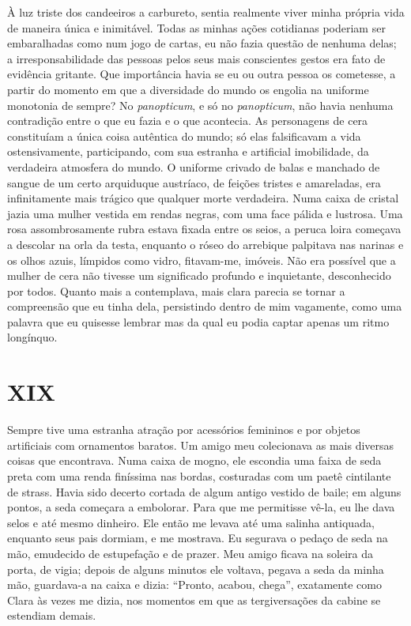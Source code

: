 À luz triste dos candeeiros a carbureto, sentia realmente viver minha própria vida de maneira única e inimitável. Todas as minhas ações cotidianas poderiam ser embaralhadas como num jogo de cartas, eu não fazia questão de nenhuma delas; a irresponsabilidade das pessoas pelos seus mais conscientes gestos era fato de evidência gritante. Que importância havia se eu ou outra pessoa os cometesse, a partir do momento em que a diversidade do mundo os engolia na uniforme monotonia de sempre? No \textit{panopticum}, e só no \textit{panopticum}, não havia nenhuma contradição entre o que eu fazia e o que acontecia. As personagens de cera constituíam a única coisa autêntica do mundo; só elas falsificavam a vida ostensivamente, participando, com sua estranha e artificial imobilidade, da verdadeira atmosfera do mundo. O uniforme crivado de balas e manchado de sangue de um certo arquiduque austríaco, de feições tristes e amareladas, era infinitamente mais trágico que qualquer morte verdadeira. Numa caixa de cristal jazia uma mulher vestida em rendas negras, com uma face pálida e lustrosa. Uma rosa assombrosamente rubra estava fixada entre os seios, a peruca loira começava a descolar na orla da testa, enquanto o róseo do arrebique palpitava nas narinas e os olhos azuis, límpidos como vidro, fitavam-me, imóveis. Não era possível que a mulher de cera não tivesse um significado profundo e inquietante, desconhecido por todos. Quanto mais a contemplava, mais clara parecia se tornar a compreensão que eu tinha dela, persistindo dentro de mim vagamente, como uma palavra que eu quisesse lembrar mas da qual eu podia captar apenas um ritmo longínquo.


\chapter*{\centering\Large{XIX}}

Sempre tive uma estranha atração por acessórios femininos e por objetos artificiais com ornamentos baratos. Um amigo meu colecionava as mais diversas coisas que encontrava. Numa caixa de mogno, ele escondia uma faixa de seda preta com uma renda finíssima nas bordas, costuradas com um paetê cintilante de strass. Havia sido decerto cortada de algum antigo vestido de baile; em alguns pontos, a seda começara a embolorar. Para que me permitisse vê-la, eu lhe dava selos e até mesmo dinheiro. Ele então me levava até uma salinha antiquada, enquanto seus pais dormiam, e me mostrava. Eu segurava o pedaço de seda na mão, emudecido de estupefação e de prazer. Meu amigo ficava na soleira da porta, de vigia; depois de alguns minutos ele voltava, pegava a seda da minha mão, guardava-a na caixa e dizia: ``Pronto, acabou, chega'', exatamente como Clara às vezes me dizia, nos momentos em que as tergiversações da cabine se estendiam demais.

